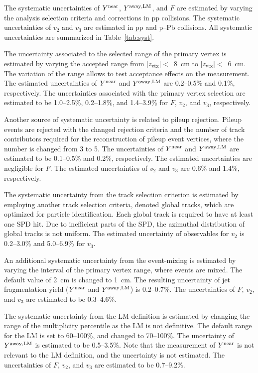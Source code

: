 The systematic uncertainties of $Y^{\rm{near}}$, $Y^{\rm{away,LM}}$, and $F$ are estimated by varying the analysis selection criteria and corrections in pp collisions. The systematic uncertainties of $v_{2}$ and $v_{3}$ are estimated in pp and p--Pb collisions. All systematic uncertainties are summarized in Table~\ref{tab:syst}.

The uncertainty associated to the selected range of the primary vertex is estimated by varying the accepted range from $|z_\mathrm{vtx}|<$~8~cm to $|z_\mathrm{vtx}|<$~6~cm. The variation of the range allows to test acceptance effects on the measurement. The estimated uncertainties of $Y^{\rm{near}}$ and $Y^{\rm{away,LM}}$ are 0.2--0.5\% and 0.1\%, respectively. The uncertainties associated with the primary vertex selection are estimated to be 1.0--2.5\%, 0.2--1.8\%, and 1.4--3.9\% for $F$, $v_{2}$, and $v_{3}$, respectively. 

Another source of systematic uncertainty is related to pileup rejection. Pileup events are rejected with the changed rejection criteria and the number of track contributors required for the reconstruction of pileup event vertices, where the number is changed from 3 to 5. The uncertainties of $Y^{\rm{near}}$ and $Y^{\rm{away,LM}}$ are estimated to be 0.1--0.5\% and 0.2\%, respectively. The estimated uncertainties are negligible for $F$. The estimated uncertainties of $v_{2}$ and $v_{3}$ are 0.6\% and 1.4\%, respectively.

The systematic uncertainty from the track selection criterion is estimated by employing another track selection criteria, denoted global tracks, which are optimized for particle identification. Each global track is required to have at least one SPD hit. Due to inefficient parts of the SPD, the azimuthal distribution of global tracks is not uniform. The estimated uncertainty of observables for $v_{2}$ is 0.2--3.0\% and 5.0--6.9\% for $v_{3}$. 

An additional systematic uncertainty from the event-mixing is estimated by varying the interval of the primary vertex range, where events are mixed. The default value of 2~cm is changed to 1~cm. The resulting uncertainty of jet fragmentation yield ($Y^{\rm{near}}$ and $Y^{\rm{away,LM}}$) is 0.2--0.7\%. The uncertainties of $F$, $v_{2}$, and $v_{3}$ are estimated to be 0.3--4.6\%.

The systematic uncertainty from the LM definition is estimated by changing the range of the multiplicity percentile as the LM is not definitive. The default range for the LM is set to 60--100\%, and changed to 70--100\%. The uncertainty of $Y^{\rm{away,LM}}$ is estimated to be 0.5--3.5\%. Note that the measurement of $Y^{\rm{near}}$ is not relevant to the LM definition, and the uncertainty is not estimated. The uncertainties of $F$, $v_{2}$, and $v_{3}$ are estimated to be 0.7--9.2\%.

